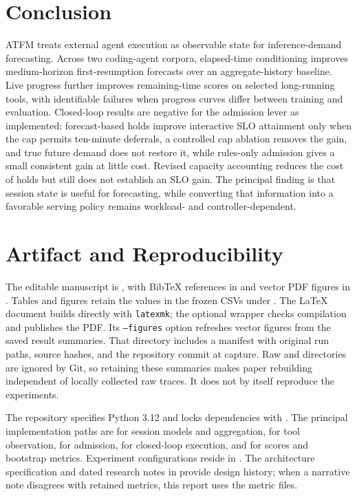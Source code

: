 \documentclass[11pt,a4paper]{article}
\begin{document}
\section{Conclusion}
\label{sec:8}
ATFM treats external agent execution as observable state for inference-demand forecasting. Across two coding-agent corpora, elapsed-time conditioning improves medium-horizon first-resumption forecasts over an aggregate-history baseline. Live progress further improves remaining-time scores on selected long-running tools, with identifiable failures when progress curves differ between training and evaluation. Closed-loop results are negative for the admission lever as implemented: forecast-based holds improve interactive SLO attainment only when the cap permits ten-minute deferrals, a controlled cap ablation removes the gain, and true future demand does not restore it, while rules-only admission gives a small consistent gain at little cost. Revised capacity accounting reduces the cost of holds but still does not establish an SLO gain. The principal finding is that session state is useful for forecasting, while converting that information into a favorable serving policy remains workload- and controller-dependent.


\FloatBarrier



\clearpage
\appendix
\section{Artifact and Reproducibility}
\label{app:A}
\setcounter{table}{0}
\renewcommand{\thetable}{A\arabic{table}}
The editable manuscript is , with BibTeX references in  and vector PDF figures in . Tables and figures retain the values in the frozen CSVs under . The LaTeX document builds directly with \texttt{latexmk}; the optional  wrapper checks compilation and publishes the PDF. Its \texttt{--figures} option refreshes vector figures from the saved result summaries. That directory includes a manifest with original run paths, source hashes, and the repository commit at capture. Raw  and  directories are ignored by Git, so retaining these summaries makes paper rebuilding independent of locally collected raw traces. It does not by itself reproduce the experiments.


The repository specifies Python 3.12 and locks dependencies with . The principal implementation paths are  for session models and aggregation,  for tool observation,  for admission,  for closed-loop execution, and  for scores and bootstrap metrics. Experiment configurations reside in . The architecture specification and dated research notes in  provide design history; when a narrative note disagrees with retained metrics, this report uses the metric files.
\end{document}
